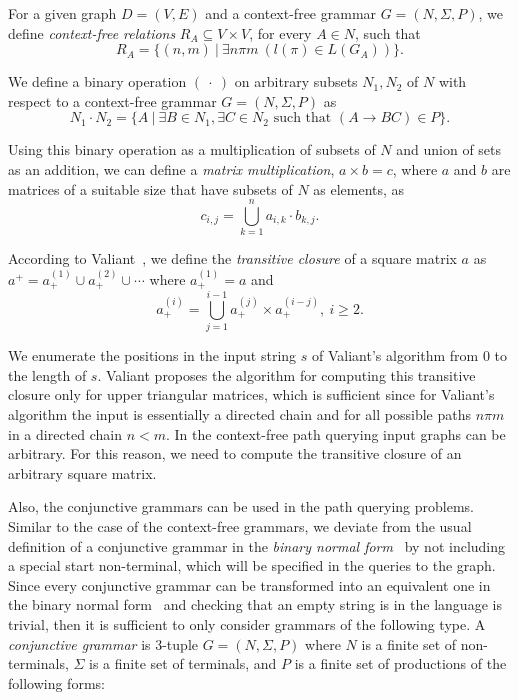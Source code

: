 For a given graph $D = (V, E)$ and a context-free grammar $G = (N, \Sigma, P)$, we define \textit{context-free relations} $R_A \subseteq V \times V$, for every $A \in N$, such that $$R_A = \{(n,m)~|~\exists n \pi m~(l(\pi) \in L(G_A))\}.$$

We define a binary operation $(~\cdot~)$ on arbitrary subsets $N_1 , N_2$ of $N$ with respect to a context-free grammar $G = (N, \Sigma, P)$ as $$N_1 \cdot N_2 = \{A~|~\exists B \in N_1, \exists C \in N_2 \text{ such that }(A \rightarrow B C) \in P\}.$$

Using this binary operation as a multiplication of subsets of $N$ and union of sets as an addition, we can define a \textit{matrix multiplication}, $a \times b = c$, where $a$ and $b$ are matrices of a suitable size that have subsets of $N$ as elements, as $$c_{i,j} = \bigcup^{n}_{k=1}{a_{i,k} \cdot b_{k,j}}.$$

According to Valiant~\cite{valiant}, we define the \textit{transitive closure} of a square matrix $a$ as $a^+ = a^{(1)}_+ \cup a^{(2)}_+ \cup \cdots$ where $a^{(1)}_+ = a$ and $$a^{(i)}_+ = \bigcup^{i-1}_{j=1}{a^{(j)}_+ \times a^{(i-j)}_+}, ~i \ge 2.$$

We enumerate the positions in the input string $s$ of Valiant's algorithm from 0 to the length of $s$. Valiant proposes the algorithm for computing this transitive closure only for upper triangular matrices, which is sufficient since for Valiant's algorithm the input is essentially a directed chain and for all possible paths $n \pi m$ in a directed chain $n < m$. In the context-free path querying input graphs can be arbitrary. For this reason, we need to compute the transitive closure of an arbitrary square matrix.

Also, the conjunctive grammars can be used in the path querying problems. Similar to the case of the context-free grammars, we deviate from the usual definition of a conjunctive grammar in the \textit{binary normal form}~\cite{okhotinConjAndBool} by not including a special start non-terminal, which will be specified in the queries to the graph. Since every conjunctive grammar can be transformed into an equivalent one in the binary normal form~\cite{okhotinConjAndBool} and checking that an empty string is in the language is trivial, then it is sufficient to only consider grammars of the following type. A \textit{conjunctive grammar} is 3-tuple $G = (N, \Sigma, P)$ where $N$ is a finite set of non-terminals, $\Sigma$ is a finite set of terminals, and $P$ is a finite set of productions of the following forms:

